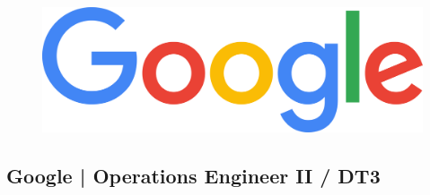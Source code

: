\documentclass[letter,10pt]{article}
\begin{document}
\begin{figure}
\includegraphics[width=0.85\linewidth]{./img/cr_google.jpg}
\end{figure}

\subsection*{Google | Operations Engineer II / DT3}
\label{sec:orga99c322}
\end{document}
